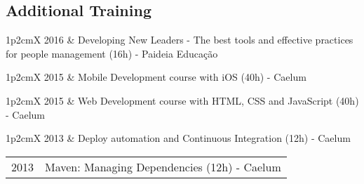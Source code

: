 \documentclass[a4paper, oneside, final]{scrartcl}
\newcommand{\vspc}{\vspace{0.15cm}} %
\newcommand{\vspcitem}{\vspace{0.1cm}} %
\begin{document}
\begin{center}


\section{Additional Training}
\begin{tabularx}{1\linewidth}{p{2cm}X}
2016       &  Developing New Leaders - The best tools and effective practices for people management (16h) - Paideia Educação \vspcitem\\
\end{tabularx}

\begin{tabularx}{1\linewidth}{p{2cm}X}
2015       & Mobile Development course with iOS (40h) - Caelum \vspcitem\\
\end{tabularx}

\begin{tabularx}{1\linewidth}{p{2cm}X}
2015       & Web Development course with HTML, CSS and JavaScript (40h) - Caelum \vspcitem\\
\end{tabularx}

\begin{tabularx}{1\linewidth}{p{2cm}X}
2013       & Deploy automation and Continuous Integration (12h) - Caelum \vspcitem\\
\end{tabularx}

\begin{tabularx}{1\linewidth}{p{2cm}X}
2013       & Maven: Managing Dependencies (12h) - Caelum \vspcitem\\
\end{tabularx}


\end{center}
\end{document}
